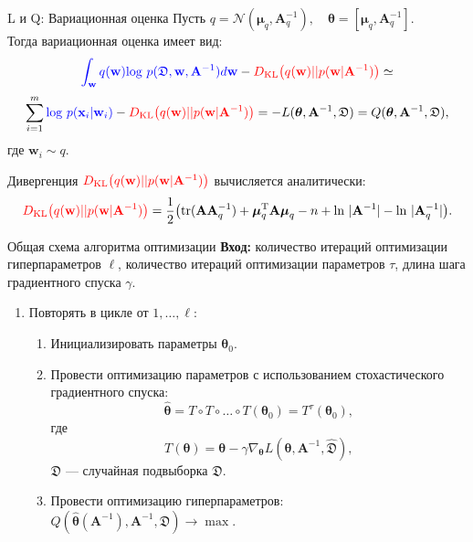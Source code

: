 \documentclass[11pt,pdf,utf8,russian,aspectratio=169]{beamer}
\begin{document}
\begin{frame}{L и Q: Вариационная оценка}
Пусть $q = \mathcal{N}(\boldsymbol{\mu}_q, \mathbf{A}^{-1}_q), \quad \boldsymbol{\theta} =  [\boldsymbol{\mu}_q, \mathbf{A}^{-1}_q].$ \\
Тогда вариационная оценка имеет вид:
$$
\textcolor{blue}{\int_{\mathbf{w}} q(\mathbf{w})\text{log}~{p(\mathfrak{D},\mathbf{w},\mathbf{A}^{-1})} d \mathbf{w}} - \textcolor{red}{D_\text{KL}\bigl(q (\mathbf{w} )|| p (\mathbf{w}|\mathbf{A}^{-1})\bigr)} \simeq
$$
$$
\sum_{i=1}^m \textcolor{blue}{\text{log}~p(\mathbf{x}_i | \mathbf{w}_i)} - \textcolor{red}{D_\text{KL}\bigl(q (\mathbf{w} )|| p (\mathbf{w}|\mathbf{A}^{-1})\bigr)} = -L(\boldsymbol{\theta}, \mathbf{A}^{-1}, \mathfrak{D}) = Q(\boldsymbol{\theta}, \mathbf{A}^{-1}, \mathfrak{D}),
$$
где $\mathbf{w}_i \sim q$.

Дивергенция $\textcolor{red}{D_\text{KL}\bigl(q (\mathbf{w} )|| p (\mathbf{w}|\mathbf{A}^{-1})\bigr)}$ вычисляется аналитически:
$$
\textcolor{red}{D_\text{KL}\bigl(q (\mathbf{w}) || p (\mathbf{w}|\mathbf{A}^{-1})\bigr)} = \frac{1}{2} \bigl( \text{tr} (\mathbf{A}\mathbf{A}^{-1}_q) + \boldsymbol{\mu}_q^\text{T}\mathbf{A}\boldsymbol{\mu}_q - n +\text{ln}~|\mathbf{A}^{-1}| - \text{ln}~|\mathbf{A}^{-1}_q| \bigr).
$$


\end{frame}

\begin{frame}{Общая схема алгоритма оптимизации}
\textbf{Вход:} количество итераций оптимизации гиперпараметров $\ell$, количество итераций оптимизации параметров $\tau$, 
длина шага градиентного спуска $\gamma$.

\begin{enumerate}
\item Повторять в цикле от $1,\dots, \ell$:
\begin{enumerate}
\item Инициализировать параметры $\boldsymbol{\theta}_0$.
\item Провести оптимизацию параметров с использованием стохастического градиентного спуска:
\[
    \hat{\boldsymbol{\theta}} = T \circ T \circ \dots \circ T(\boldsymbol{\theta}_0) = T^\tau(\boldsymbol{\theta}_0),
\]
где 
\[
    T(\boldsymbol{\theta}) =\boldsymbol{\theta} - \gamma \nabla_{\boldsymbol{\theta}} L(\boldsymbol{\theta}, \mathbf{A}^{-1}, \hat{\mathfrak{D}}),
\]
$\mathfrak{D}$ --- случайная подвыборка $\mathfrak{D}$.
\item Провести оптимизацию гиперпараметров: $Q(\hat{\boldsymbol{\theta}}(\mathbf{A}^{-1}), \mathbf{A}^{-1}, \mathfrak{D}) \to \max$.

\end{enumerate}
\end{enumerate}
\end{frame}
\end{document}
